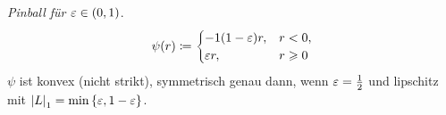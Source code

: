 \begin{bsp}
\label{bsp:2.3.5}
\textit{Pinball für $\varepsilon \in(0,1)$}.
\begin{align*}
\psi(r)\coloneq 
\begin{cases}
-1(1-\varepsilon)r, & r < 0,\\
\varepsilon r, & r\geqslant 0
\end{cases}
\end{align*}
$\psi$ ist konvex (nicht strikt), symmetrisch genau dann, wenn $\varepsilon
=\frac{1}{2}$ und lipschitz mit $\left|L\right|_1 = \min\left\{ \varepsilon,1-\varepsilon \right\}$.\bsphere
\end{bsp}
